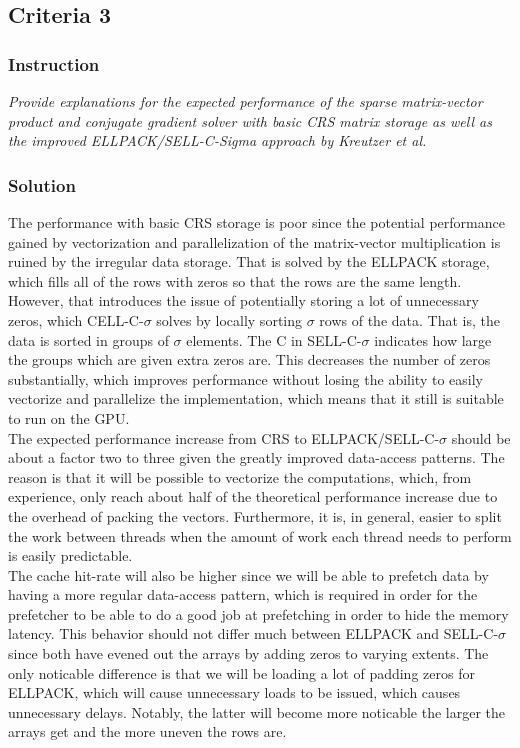 \documentclass[10pt]{article}
\begin{document}
\subsection{Criteria 3}
\subsubsection{Instruction}
\textit{Provide explanations for the expected performance of the sparse matrix-vector product and conjugate gradient solver with basic CRS matrix storage as well as the improved ELLPACK/SELL-C-Sigma approach by Kreutzer et al.}
\subsubsection{Solution}
The performance with basic CRS storage is poor since the potential performance gained by vectorization and parallelization of the matrix-vector multiplication is ruined by the irregular data storage. That is solved by the ELLPACK storage, which fills all of the rows with zeros so that the rows are the same length. \\

However, that introduces the issue of potentially storing a lot of unnecessary zeros, which CELL-C-$\sigma$ solves by locally sorting $\sigma$ rows of the data. That is, the data is sorted in groups of $\sigma$ elements. The C in SELL-C-$\sigma$ indicates how large the groups which are given extra zeros are. This decreases the number of zeros substantially, which improves performance without losing the ability to easily vectorize and parallelize the implementation, which means that it still is suitable to run on the GPU. \\

The expected performance increase from CRS to ELLPACK/SELL-C-$\sigma$ should be about a factor two to three given the greatly improved data-access patterns. The reason is that it will be possible to vectorize the computations, which, from experience, only reach about half of the theoretical performance increase due to the overhead of packing the vectors. Furthermore, it is, in general, easier to split the work between threads when the amount of work each thread needs to perform is easily predictable. \\

The cache hit-rate will also be higher since we will be able to prefetch data by having a more regular data-access pattern, which is required in order for the prefetcher to be able to do a good job at prefetching in order to hide the memory latency. This behavior should not differ much between ELLPACK and SELL-C-$\sigma$ since both have evened out the arrays by adding zeros to varying extents. The only noticable difference is that we will be loading a lot of padding zeros for ELLPACK, which will cause unnecessary loads to be issued, which causes unnecessary delays. Notably, the latter will become more noticable the larger the arrays get and the more uneven the rows are. \\
\end{document}
